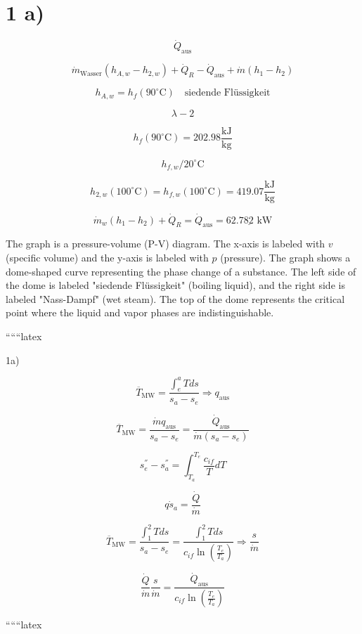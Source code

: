 \section*{1 a)}

\[
\dot{Q}_{\text{aus}}
\]


\[
\dot{m}_{\text{Wasser}} (h_{A,w} - h_{2,w}) + \dot{Q}_R - \dot{Q}_{\text{aus}} + \dot{m} (h_1 - h_2)
\]

\[
h_{A,w} = h_f (90^\circ \text{C}) \quad \text{siedende Flüssigkeit}
\]

\[
\lambda - 2
\]

\[
h_f (90^\circ \text{C}) = 202.98 \frac{\text{kJ}}{\text{kg}}
\]

\[
h_{f,w} / 20^\circ \text{C}
\]

\[
h_{2,w} (100^\circ \text{C}) = h_{f,w} (100^\circ \text{C}) = 419.07 \frac{\text{kJ}}{\text{kg}}
\]

\[
\dot{m}_w (h_1 - h_2) + \dot{Q}_R = \dot{Q}_{\text{aus}} = \underline{62.782 \text{ kW}}
\]


The graph is a pressure-volume (P-V) diagram. The x-axis is labeled with $v$ (specific volume) and the y-axis is labeled with $p$ (pressure). The graph shows a dome-shaped curve representing the phase change of a substance. The left side of the dome is labeled "siedende Flüssigkeit" (boiling liquid), and the right side is labeled "Nass-Dampf" (wet steam). The top of the dome represents the critical point where the liquid and vapor phases are indistinguishable.

``````latex

1a)

\[
\overline{T}_{\text{MW}} = \frac{\int_e^a T ds}{s_a - s_e} \Rightarrow q_{\text{aus}}
\]

\[
\overline{T}_{\text{MW}} = \frac{\dot{m} q_{\text{aus}}}{s_a - s_e} = \frac{\dot{Q}_{\text{aus}}}{\dot{m} (s_a - s_e)}
\]

\[
s_e^{''} - s_a^{''} = \int_{T_a}^{T_e} \frac{c_{if}}{T} dT
\]

\[
q \dot{s}_a = \frac{\dot{Q}}{\dot{m}}
\]

\[
\overline{T}_{\text{MW}} = \frac{\int_1^2 T ds}{s_a - s_e} = \frac{\int_1^2 T ds}{c_{if} \ln \left( \frac{T_e}{T_a} \right)} \Rightarrow \frac{s}{\dot{m}}
\]

\[
\frac{\dot{Q}}{\dot{m}} \frac{s}{\dot{m}} = \frac{\dot{Q}_{\text{aus}}}{c_{if} \ln \left( \frac{T_e}{T_a} \right)}
\]

``````latex
